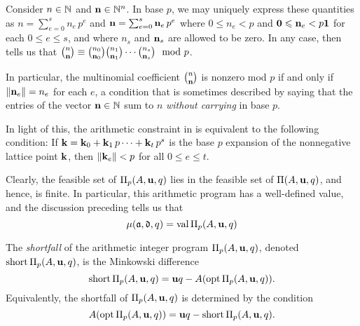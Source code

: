 \documentclass[11pt]{amsart}
\newcommand{\short}{\operatorname{short}}
\begin{document}
\begin{remark}
 \label{dickson: R}
   Consider $n \in \mathbb{N}$ and $\mathbf{n} \in \mathbb{N}^n$.
   In base $p$, we may uniquely express these quantities as $n= \sum_{e=0}^s n_e \, p^e$ and $\mathbf{n}=\sum_{e=0}^s \mathbf{n}_e \, p^e$
where $0\le n_e < p$ and $\mathbf{0}\leqslant\mathbf{n}_e < p  \mathbf{1}$ for each $0 \leq e \leq s$, and where $n_s$ and $\mathbf{n}_s$ are allowed to be zero.
In any case, \cite{dickson.multinomial} then tells us that
$\binom{n}{\mathbf{n}}\equiv \binom{n_0}{\mathbf{n}_0}\binom{n_1}{\mathbf{n}_1}\cdots \binom{n_s}{\mathbf{n}_s} \mod{p}$.

In particular, the multinomial coefficient $\binom{n}{\mathbf{n}}$ is nonzero mod $p$ if and only if $\| \mathbf{n}_e \|=n_e$ for each $e$, a condition that is sometimes described by saying that the entries of the vector $\mathbf{n} \in \mathbb{N}$ sum to $n$ \emph{without carrying} in base $p$.

In light of this, the arithmetic constraint in  is equivalent to the following condition:  If
 $\mathbf{k} = \mathbf{k}_0 + \mathbf{k}_1 \, p\cdots + \mathbf{k}_t \, p^s$ is the base $p$ expansion of the nonnegative lattice point $\mathbf{k}$, then $\| \mathbf{k}_e \| < p$ for all $0 \leq e \leq t$.
\end{remark}

Clearly, the feasible set of $\Pi_p(A, \mathbf{u}, q)$ lies in the feasible set of $\Pi(A, \mathbf{u},q)$, and hence, is finite.  
In particular, this arithmetic program has a well-defined value, and the discussion preceding  tells us that
%
\begin{equation}
\label{mu as program value: eq}
\mu(\mathfrak{a},\mathfrak{d},q) = \operatorname{val} \Pi_p(A,\mathbf{u},q)
\end{equation}
%

\begin{definition}[Shortfalls]  The \emph{shortfall} of the arithmetic integer program $\Pi_p(A, \mathbf{u}, q)$, denoted $\short \IP_p(A, \vv{u}, q)$, is the Minkowski difference
%
\[ \short \IP_p(A, \vv{u}, q) = \vv{u}q - A( \opt \IP_p(A, \vv{u}, q)).\]  
Equivalently, the shortfall of $\Pi_p(A, \mathbf{u},q)$ is determined by the condition
\[ A(\opt \IP_p(A, \vv{u}, q)) = \vv{u}q - \short \IP_p(A, \vv{u}, q).\]
%

%
\end{definition}
\end{document}
